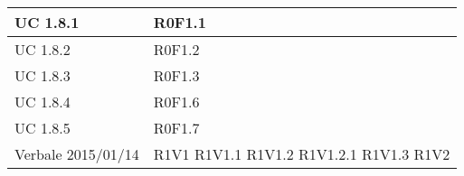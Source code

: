 \begin{center}
\begin{longtable}{| p{4cm} | p{4cm} |}
		\hline
		UC 1.8.1  &  R0F1.1 \\
		\hline
		UC 1.8.2  &  R0F1.2 \\
		\hline
		UC 1.8.3  &  R0F1.3 \\
		\hline
		UC 1.8.4  &  R0F1.6 \\
		\hline
		UC 1.8.5  &  R0F1.7 \\
		\hline
		Verbale 2015/01/14  &  R1V1 \newline R1V1.1 \newline R1V1.2 \newline R1V1.2.1 \newline R1V1.3 \newline R1V2 \\
		\hline

	\end{longtable}
	\egroup
	\end{center}


